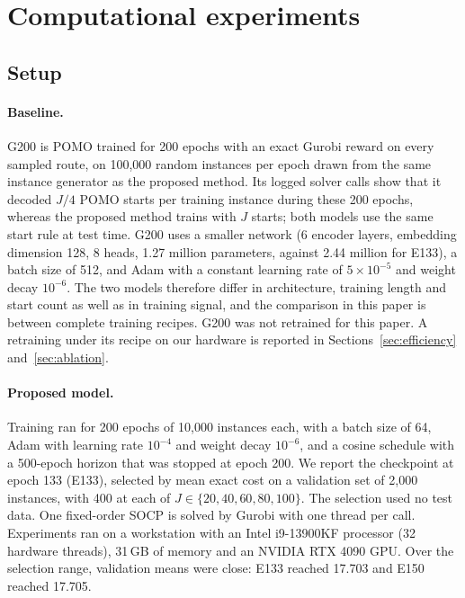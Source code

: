 \documentclass[preprint,12pt,authoryear]{elsarticle}
\begin{document}
\section{Computational experiments}
\label{sec:experiments}

\subsection{Setup}

\paragraph{Baseline.} G200 is POMO trained for 200 epochs with an exact Gurobi reward on every sampled route, on 100,000 random instances per epoch drawn from the same instance generator as the proposed method. Its logged solver calls show that it decoded $J/4$ POMO starts per training instance during these 200 epochs, whereas the proposed method trains with $J$ starts; both models use the same start rule at test time. G200 uses a smaller network (6 encoder layers, embedding dimension 128, 8 heads, 1.27 million parameters, against 2.44 million for E133), a batch size of 512, and Adam with a constant learning rate of $5 \times 10^{-5}$ and weight decay $10^{-6}$. The two models therefore differ in architecture, training length and start count as well as in training signal, and the comparison in this paper is between complete training recipes. G200 was not retrained for this paper. A retraining under its recipe on our hardware is reported in Sections~\ref{sec:efficiency} and~\ref{sec:ablation}.

\paragraph{Proposed model.} Training ran for 200 epochs of 10,000 instances each, with a batch size of 64, Adam with learning rate $10^{-4}$ and weight decay $10^{-6}$, and a cosine schedule with a 500-epoch horizon that was stopped at epoch 200. We report the checkpoint at epoch 133 (E133), selected by mean exact cost on a validation set of 2,000 instances, with 400 at each of $J \in \{20,40,60,80,100\}$. The selection used no test data. One fixed-order SOCP is solved by Gurobi with one thread per call. Experiments ran on a workstation with an Intel i9-13900KF processor (32 hardware threads), 31\,GB of memory and an NVIDIA RTX 4090 GPU. Over the selection range, validation means were close: E133 reached 17.703 and E150 reached 17.705.
\end{document}
